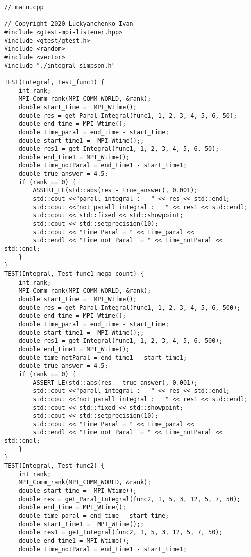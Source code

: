 \documentclass{report}
\begin{document}
\begin{lstlisting}
// main.cpp

// Copyright 2020 Luckyanchenko Ivan
#include <gtest-mpi-listener.hpp>
#include <gtest/gtest.h>
#include <random>
#include <vector>
#include "./integral_simpson.h"

TEST(Integral, Test_func1) {
    int rank;
    MPI_Comm_rank(MPI_COMM_WORLD, &rank);
    double start_time =  MPI_Wtime();
    double res = get_Paral_Integral(func1, 1, 2, 3, 4, 5, 6, 50);
    double end_time = MPI_Wtime();
    double time_paral = end_time - start_time;
    double start_time1 =  MPI_Wtime();;
    double res1 = get_Integral(func1, 1, 2, 3, 4, 5, 6, 50);
    double end_time1 = MPI_Wtime();
    double time_notParal = end_time1 - start_time1;
    double true_answer = 4.5;
    if (rank == 0) {
        ASSERT_LE(std::abs(res - true_answer), 0.001);
        std::cout <<"parall integral :   " << res << std::endl;
        std::cout <<"not parall integral :   " << res1 << std::endl;
        std::cout << std::fixed << std::showpoint;
        std::cout << std::setprecision(10);
        std::cout << "Time Paral = " << time_paral <<
        std::endl << "Time not Paral  = " << time_notParal << std::endl;
    }
}
TEST(Integral, Test_func1_mega_count) {
    int rank;
    MPI_Comm_rank(MPI_COMM_WORLD, &rank);
    double start_time =  MPI_Wtime();
    double res = get_Paral_Integral(func1, 1, 2, 3, 4, 5, 6, 500);
    double end_time = MPI_Wtime();
    double time_paral = end_time - start_time;
    double start_time1 =  MPI_Wtime();;
    double res1 = get_Integral(func1, 1, 2, 3, 4, 5, 6, 500);
    double end_time1 = MPI_Wtime();
    double time_notParal = end_time1 - start_time1;
    double true_answer = 4.5;
    if (rank == 0) {
        ASSERT_LE(std::abs(res - true_answer), 0.001);
        std::cout <<"parall integral :   " << res << std::endl;
        std::cout <<"not parall integral :   " << res1 << std::endl;
        std::cout << std::fixed << std::showpoint;
        std::cout << std::setprecision(10);
        std::cout << "Time Paral = " << time_paral <<
        std::endl << "Time not Paral  = " << time_notParal << std::endl;
    }
}
TEST(Integral, Test_func2) {
    int rank;
    MPI_Comm_rank(MPI_COMM_WORLD, &rank);
    double start_time =  MPI_Wtime();
    double res = get_Paral_Integral(func2, 1, 5, 3, 12, 5, 7, 50);
    double end_time = MPI_Wtime();
    double time_paral = end_time - start_time;
    double start_time1 =  MPI_Wtime();;
    double res1 = get_Integral(func2, 1, 5, 3, 12, 5, 7, 50);
    double end_time1 = MPI_Wtime();
    double time_notParal = end_time1 - start_time1;

\end{lstlisting}
\end{document}
